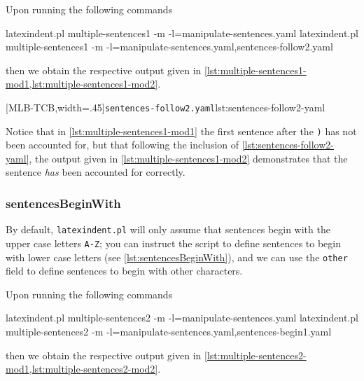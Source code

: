  Upon running the following commands  
 \begin{widepage}
  \begin{commandshell}
latexindent.pl multiple-sentences1 -m -l=manipulate-sentences.yaml
latexindent.pl multiple-sentences1 -m -l=manipulate-sentences.yaml,sentences-follow2.yaml
\end{commandshell}
 \end{widepage}
 then we obtain the respective output given in
 \cref{lst:multiple-sentences1-mod1,lst:multiple-sentences1-mod2}.

 \begin{cmhtcbraster}[
   raster force size=false,
   raster column 1/.style={add to width=1cm},
  ]
  [MLB-TCB,width=.45\textwidth]{\texttt{sentences-follow2.yaml}}{lst:sentences-follow2-yaml}
 \end{cmhtcbraster}

 Notice that in \cref{lst:multiple-sentences1-mod1} the first sentence after the
 \texttt{)} has not been accounted for, but that following the inclusion of
 \cref{lst:sentences-follow2-yaml}, the output given in
 \cref{lst:multiple-sentences1-mod2} demonstrates that the sentence \emph{has} been
 accounted for correctly.

\subsubsection{sentencesBeginWith}
 By default, \texttt{latexindent.pl} will only assume that sentences begin with the upper
 case letters \texttt{A-Z}; you can instruct the script to define sentences to begin with
 lower case letters (see \cref{lst:sentencesBeginWith}), and we can use the \texttt{other}
 field to define sentences to begin with other characters. 


 Upon running the following commands  
 \begin{widepage}
  \begin{commandshell}
latexindent.pl multiple-sentences2 -m -l=manipulate-sentences.yaml
latexindent.pl multiple-sentences2 -m -l=manipulate-sentences.yaml,sentences-begin1.yaml
\end{commandshell}
 \end{widepage}
 then we obtain the respective output given in
 \cref{lst:multiple-sentences2-mod1,lst:multiple-sentences2-mod2}.

